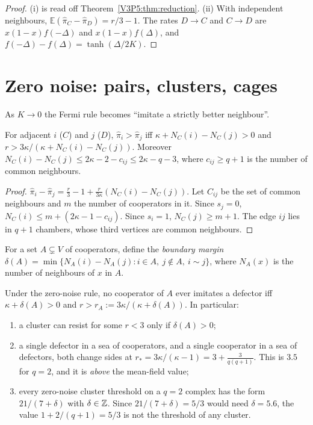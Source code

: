 \begin{proof}
(i) is read off Theorem~\ref{V3P5:thm:reduction}. (ii) With independent neighbours,
$\mathbb E(\hat\pi_C-\hat\pi_D)=r/3-1$. The rates $D\to C$ and $C\to D$ are
$x(1-x)f(-\Delta)$ and $x(1-x)f(\Delta)$, and $f(-\Delta)-f(\Delta)=\tanh(\Delta/2K)$.
\end{proof}

\section{Zero noise: pairs, clusters, cages}\label{V3P5:sec:zero}

As $K\to0$ the Fermi rule becomes ``imitate a strictly better neighbour''.

\begin{lemma}\label{V3P5:lem:pair}
For adjacent $i$ ($C$) and $j$ ($D$), $\hat\pi_i>\hat\pi_j$ iff
$\kappa+N_C(i)-N_C(j)>0$ and $r>3\kappa/(\kappa+N_C(i)-N_C(j))$. Moreover
$N_C(i)-N_C(j)\le2\kappa-2-c_{ij}\le2\kappa-q-3$, where $c_{ij}\ge q+1$ is the number of
common neighbours.
\end{lemma}

\begin{proof}
$\hat\pi_i-\hat\pi_j=\frac r3-1+\frac r{3\kappa}(N_C(i)-N_C(j))$. Let $C_{ij}$ be the set of
common neighbours and $m$ the number of cooperators in it. Since $s_j=0$, $N_C(i)\le
m+(2\kappa-1-c_{ij})$. Since $s_i=1$, $N_C(j)\ge m+1$. The edge $ij$ lies in $q+1$ chambers,
whose third vertices are common neighbours.
\end{proof}

For a set $A\subsetneq V$ of cooperators, define the \emph{boundary margin}
$\delta(A)=\min\{N_A(i)-N_A(j):i\in A,\ j\notin A,\ i\sim j\}$, where $N_A(x)$ is the number
of neighbours of $x$ in $A$.

\begin{theorem}\label{V3P5:thm:cluster}
Under the zero-noise rule, no cooperator of $A$ ever imitates a defector iff
$\kappa+\delta(A)>0$ and $r>r_A:=3\kappa/(\kappa+\delta(A))$. In particular:
\begin{enumerate}
\item[(i)] a cluster can resist for some $r<3$ only if $\delta(A)>0$;
\item[(ii)] a single defector in a sea of cooperators, and a single cooperator in a sea of
defectors, both change sides at $r_*=3\kappa/(\kappa-1)=3+\frac3{q(q+1)}$. This is $3.5$ for
$q=2$, and it is \emph{above} the mean-field value;
\item[(iii)] every zero-noise cluster threshold on a $q=2$ complex has the form $21/(7+\delta)$
with $\delta\in\mathbb{Z}$. Since $21/(7+\delta)=5/3$ would need $\delta=5.6$, the value
$1+2/(q+1)=5/3$ is not the threshold of any cluster.
\end{enumerate}
\end{theorem}

